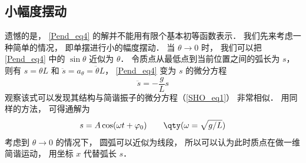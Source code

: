 \subsection{小幅度摆动}

遗憾的是， \autoref{Pend_eq4} 的解并不能用有限个基本初等函数表示． 我们先来考虑一种简单的情况， 即单摆进行小的幅度摆动． 当 $\theta \to 0$ 时， 我们可以把\autoref{Pend_eq4} 中的 $\sin\theta$ 近似为 $\theta$． 令质点从最低点到当前位置之间的弧长为 $s$， 则有 $s = \theta L$ 和 $\ddot s = a_\theta = \ddot\theta L$， \autoref{Pend_eq4} 变为 $s$ 的微分方程
\begin{equation}
\ddot s = - \frac gL s
\end{equation}
观察该式可以发现其结构与简谐振子的微分方程（\autoref{SHO_eq1}） 非常相似． 用同样的方法， 可得通解为
\begin{equation}
s = A\cos(\omega t + \varphi_0)  \qquad \qty(\omega  = \sqrt{g/L})
\end{equation}
考虑到 $\theta \to 0$ 的情况下， 圆弧可以近似为线段， 所以可以认为此时质点在做一维简谐运动， 用坐标 $x$ 代替弧长 $s$．



